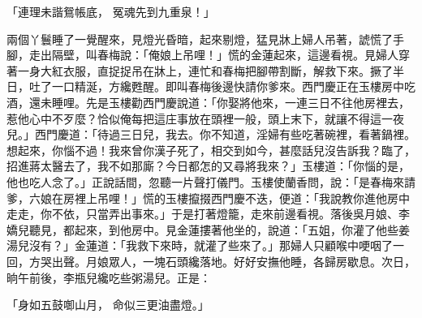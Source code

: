 「連理未諧鴛帳底，  冤魂先到九重泉！」

兩個丫鬟睡了一覺醒來，見燈光昏暗，起來剔燈，猛見牀上婦人吊著，諕慌了手腳，走出隔壁，叫春梅說：「俺娘上吊哩！」慌的金蓮起來，這邊看視。見婦人穿著一身大紅衣服，直捉捉吊在牀上，連忙和春梅把腳帶割斷，解救下來。撅了半日，吐了一口精涎，方纔甦醒。即叫春梅後邊快請你爹來。西門慶正在玉樓房中吃酒，還未睡哩。先是玉樓勸西門慶說道：「你娶將他來，一連三日不往他房裡去，惹他心中不歹麼？恰似俺每把這庄事放在頭裡一般，頭上末下，就讓不得這一夜兒。」西門慶道：「待過三日兒，我去。你不知道，淫婦有些吃著碗裡，看著鍋裡。想起來，你惱不過！我來曾你漢子死了，相交到如今，甚麼話兒沒告訴我？臨了，招進蔣太醫去了，我不如那廝？今日都怎的又尋將我來？」玉樓道：「你惱的是，他也吃人念了。」正說話間，忽聽一片聲打儀門。玉樓使蘭香問，說：「是春梅來請爹，六娘在房裡上吊哩！」慌的玉樓攛掇西門慶不迭，便道：「我說教你進他房中走走，你不依，只當弄出事來。」于是打著燈籠，走來前邊看視。落後吳月娘、李嬌兒聽見，都起來，到他房中。見金蓮摟著他坐的，說道：「五姐，你灌了他些姜湯兒沒有？」金蓮道：「我救下來時，就灌了些來了。」那婦人只顧喉中哽咽了一回，方哭出聲。月娘眾人，一塊石頭纔落地。好好安撫他睡，各歸房歇息。次日，晌午前後，李瓶兒纔吃些粥湯兒。正是：

「身如五鼓啣山月，  命似三更油盡燈。」

